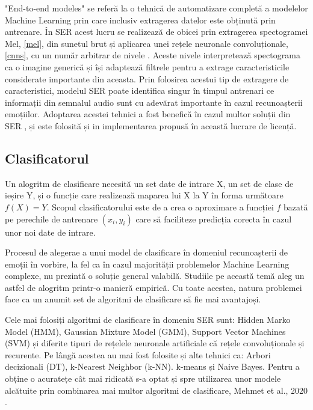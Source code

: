 \documentclass[a4paper,12pt]{book}
\begin{document}
						"End-to-end modeles" se referă la o tehnică de automatizare completă a modelelor Machine Learning prin care inclusiv extragerea datelor este obținută prin antrenare. În SER acest lucru se realizează de obicei prin extragerea spectogramei Mel, \ref{mel}, din sunetul brut și aplicarea unei rețele neuronale convoluționale, \ref{cnns}, cu un număr arbitrar de nivele \cite{graves,tzir}. Aceste nivele interpretează spectograma ca o imagine generică și își adaptează filtrele pentru a extrage caracteristicile considerate importante din aceasta. Prin folosirea acestui tip de extragere de caracteristici, modelul SER poate identifica singur în timpul antrenari ce informații din semnalul audio sunt cu adevărat importante în cazul recunoașterii emoțiilor. Adoptarea acestei tehnici a fost benefică în cazul multor soluții din SER \cite{graves, tzir, zhang, yuan, adieu, e2e}, și este folosită și in implementarea propusă în această lucrare de licență.
					\subsection{Clasificatorul}
						Un alogritm de clasificare necesită un set date de intrare X, un set de clase de ieșire Y, și o funcție care realizează maparea lui X la Y în forma următoare \(f(X)=Y\). Scopul clasificatorului este de a crea o aproximare a funcției \(f\) bazată pe perechile de antrenare $(x_i,y_i)$ care să faciliteze predicția corecta în cazul unor noi date de intrare. \par
						
						Procesul de alegerae a unui model de clasificare în domeniul recunoașterii de emoții în vorbire, la fel ca în cazul majorității problemelor Machine Learning complexe, nu prezintă o soluție general valabilă. Studiile pe această temă aleg un astfel de alogritm printr-o manieră empirică. Cu toate acestea, natura problemei face ca un anumit set de algoritmi de clasificare să fie mai avantajoși.\par 
						Cele mai folosiți algoritmi de clasificare în domeniu SER sunt: Hidden Marko Model (HMM), Gaussian Mixture Model (GMM), Support Vector Machines (SVM) și diferite tipuri de rețelele neuronale artificiale că rețele convoluționale și recurente. Pe lângă acestea au mai fost folosite și alte tehnici ca: Arbori decizionali (DT), k-Nearest Neighbor (k-NN). k-means și Naive Bayes. Pentru a obține o acuratețe cât mai ridicată s-a optat și spre utilizarea unor modele alcătuite prin combinarea mai multor algoritmi de clasificare, Mehmet et al., 2020 \cite{mehmet}.
							
\end{document}
